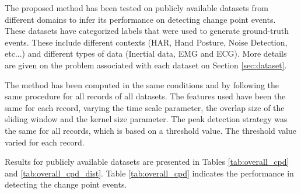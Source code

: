The proposed method has been tested on publicly available datasets from different domains to infer its performance on detecting change point events. These datasets have categorized labels that were used to generate ground-truth events. These include different contexts (HAR, Hand Posture, Noise Detection, etc...) and different types of data (Inertial data, EMG and ECG). More details are given on the problem associated with each dataset on Section \ref{sec:dataset}.
\par
The method has been computed in the same conditions and by following the same procedure for all records of all datasets. The features used have been the same for each record, varying the time scale parameter, the overlap size of the sliding window and the kernel size parameter. The peak detection strategy was the same for all records, which is based on a threshold value. The threshold value varied for each record.  
\par
Results for publicly available datasets are presented in Tables \ref{tab:overall_cpd} and \ref{tab:overall_cpd_dist}. Table \ref{tab:overall_cpd} indicates the performance in detecting the change point events. 




